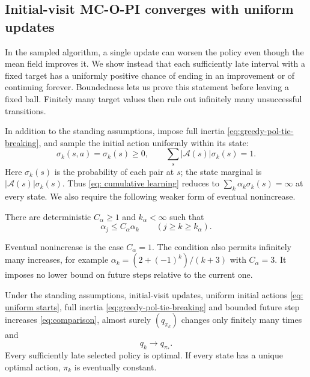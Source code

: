 \subsection{Initial-visit MC-O-PI converges with uniform updates}
In the sampled algorithm, a single update can worsen the policy even though the mean field improves it. We show instead that each sufficiently late interval with a fixed target has a uniformly positive chance of ending in an improvement or of continuing forever. Boundedness lets us prove this statement before leaving a fixed ball. Finitely many target values then rule out infinitely many unsuccessful transitions.

In addition to the standing assumptions, impose full inertia \eqref{eq:greedy-pol-tie-breaking}, and sample the initial action uniformly within its state:
\begin{equation}\label{eq: uniform starts}
\sigma_k(s,a)=\sigma_k(s)\ge0,\qquad
\sum_s|\mathcal A(s)|\sigma_k(s)=1.
\end{equation}
Here $\sigma_k(s)$ is the probability of each pair at $s$; the state marginal is $|\mathcal A(s)|\sigma_k(s)$. Thus \eqref{eq: cumulative learning} reduces to $\sum_k\alpha_k\sigma_k(s)=\infty$ at every state. We also require the following weaker form of eventual nonincrease.
\begin{assumption}\label{asp: additional conditions on learning rate}
There are deterministic $C_\alpha\ge1$ and $k_\alpha<\infty$ such that
\begin{equation}\label{eq:comparison}
\alpha_j\le C_\alpha\alpha_k\qquad(j\ge k\ge k_\alpha).
\end{equation}
\end{assumption}
Eventual nonincrease is the case $C_\alpha=1$. The condition also permits infinitely many increases, for example $\alpha_k=(2+(-1)^k)/(k+3)$ with $C_\alpha=3$. It imposes no lower bound on future steps relative to the current one.

\begin{theorem}\label{thm: convergence mcopi uniform}
Under the standing assumptions, initial-visit updates, uniform initial actions \eqref{eq: uniform starts}, full inertia \eqref{eq:greedy-pol-tie-breaking} and bounded future step increases \eqref{eq:comparison}, almost surely $(q_{\pi_k})$ changes only finitely many times and
\[
q_k\longrightarrow q_{\pi_*}.
\]
Every sufficiently late selected policy is optimal. If every state has a unique optimal action, $\pi_k$ is eventually constant.
\end{theorem}
